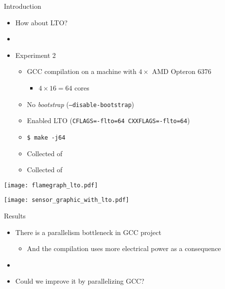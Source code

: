 \begin{frame}{Introduction}
    \begin{itemize}
        \item How about LTO?
        \item[]
        \item Experiment 2
        \begin{itemize}
            \item GCC compilation on a machine with $4\times$ AMD Opteron 6376
                \begin{itemize}
                    \item $4 \times 16 = 64$ cores
                \end{itemize}
            \item No \textit{bootstrap} (\texttt{--disable-bootstrap})
            \item Enabled LTO (\texttt{CFLAGS=-flto=64 CXXFLAGS=-flto=64})
            \item \texttt{\$ make -j64}
            \item Collected {\color{blue}{Compilation Time}} of {\color{red}{each file}}
            \item Collected {\color{blue}{Consumed Energy}} of {\color{red}{all CPUs}}
        \end{itemize}
    \end{itemize}
\end{frame}

\begin{frame}
    \texttt{[image: flamegraph\_lto.pdf]}
    \label{fig:analysis_lto}
\end{frame}

\begin{frame}
    \centering
    \texttt{[image: sensor\_graphic\_with\_lto.pdf]}
    \label{fig:sensor_graphic_lto}
\end{frame}


\begin{frame}{Results}
    \begin{itemize}
        \item There is a parallelism bottleneck in GCC project
            \begin{itemize}
                \item And the compilation uses more electrical power as a consequence
            \end{itemize}
        \item[]
        \item Could we improve it by parallelizing GCC?
    \end{itemize}
\end{frame}

